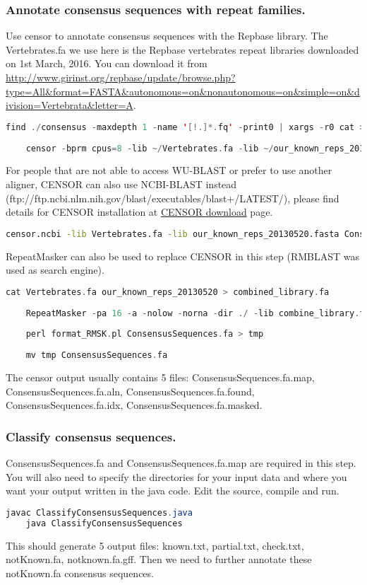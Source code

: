 \documentclass[a4paper,12pt]{article}
\begin{document}
	\subsubsection{Annotate consensus sequences with repeat families.}
	Use censor to annotate consensus sequences with the Repbase library. The Vertebrates.fa we use here is the Repbase vertebrates repeat libraries downloaded on 1st March, 2016. You can download it from \url{http://www.girinst.org/repbase/update/browse.php?type=All&format=FASTA&autonomous=on&nonautonomous=on&simple=on&division=Vertebrata&letter=A}.
	\begin{lstlisting}[language=scala]
	find ./consensus -maxdepth 1 -name '[!.]*.fq' -print0 | xargs -r0 cat > ConsensusSequences.fa
	
	censor -bprm cpus=8 -lib ~/Vertebrates.fa -lib ~/our_known_reps_20130520.fasta ConsensusSequences.fa  \end{lstlisting}
	For people that are not able to access WU-BLAST or prefer to use another aligner, CENSOR can also use NCBI-BLAST instead (ftp://ftp.ncbi.nlm.nih.gov/blast/executables/blast+/LATEST/), please find details for CENSOR installation at \href{http://www.girinst.org/downloads/software/censor/} {\color{blue}CENSOR download} page.
	\begin{lstlisting}[language=bash]
	censor.ncbi -lib Vertebrates.fa -lib our_known_reps_20130520.fasta ConsensusSequences.fa 
	\end{lstlisting}
	RepeatMasker can also be used to replace CENSOR in this step (RMBLAST was used as search engine).	
	\begin{lstlisting}[language=scala]
	cat Vertebrates.fa our_known_reps_20130520 > combined_library.fa
	
	RepeatMasker -pa 16 -a -nolow -norna -dir ./ -lib combine_library.fa ConsensusSequences.fa
	
	perl format_RMSK.pl ConsensusSequences.fa > tmp 
	
	mv tmp ConsensusSequences.fa \end{lstlisting}
	The censor output usually contains 5 files: ConsensusSequences.fa.map, ConsensusSequences.fa.aln, ConsensusSequences.fa.found, ConsensusSequences.fa.idx, ConsensusSequences.fa.masked. 
	
	\subsubsection{Classify consensus sequences.}
	ConsensusSequences.fa and ConsensusSequences.fa.map are required in this step. You will also need to specify the directories for your input data and where you want your output written in the java code. Edit the source, compile and run.\\
	\begin{lstlisting}[language=java]
	javac ClassifyConsensusSequences.java
	java ClassifyConsensusSequences \end{lstlisting}
	This should generate 5 output files: known.txt, partial.txt, check.txt, notKnown.fa, notknown.fa.gff. 
	Then we need to further annotate these notKnown.fa consensus sequences. 
	
\end{document}
